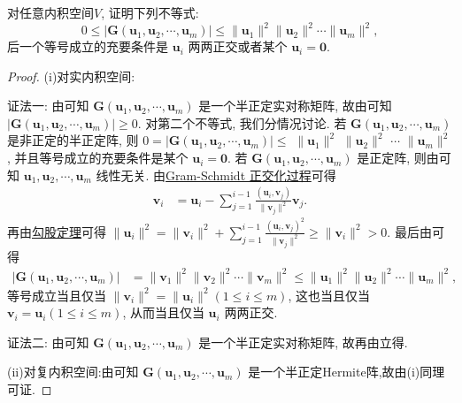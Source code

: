 \documentclass[../../main.tex]{subfiles}%
\begin{document}
\begin{proposition}\label{proposition:例9.16}
对任意内积空间$V$,
证明下列不等式:
\[
0 \leqslant  |\boldsymbol{G}(\boldsymbol{u}_1,\boldsymbol{u}_2,\cdots,\boldsymbol{u}_m)| \leqslant  \|\boldsymbol{u}_1\|^2\|\boldsymbol{u}_2\|^2\cdots\|\boldsymbol{u}_m\|^2,
\]
后一个等号成立的充要条件是 $\boldsymbol{u}_i$ 两两正交或者某个 $\boldsymbol{u}_i = \boldsymbol{0}$.
\end{proposition}
\begin{proof}

(i)对实内积空间:

{\color{blue}证法一:}
由可知 $\boldsymbol{G}(\boldsymbol{u}_1,\boldsymbol{u}_2,\cdots,\boldsymbol{u}_m)$ 是一个半正定实对称矩阵, 故由可知 $|\boldsymbol{G}(\boldsymbol{u}_1,\boldsymbol{u}_2,\cdots,\boldsymbol{u}_m)| \geqslant  0$. 对第二个不等式, 我们分情况讨论. 若 $\boldsymbol{G}(\boldsymbol{u}_1,\boldsymbol{u}_2,\cdots,\boldsymbol{u}_m)$ 是非正定的半正定阵, 则 $0 = |\boldsymbol{G}(\boldsymbol{u}_1,\boldsymbol{u}_2,\cdots,\boldsymbol{u}_m)| \leqslant $   $\|\boldsymbol{u}_1\|^2$  $\|\boldsymbol{u}_2\|^2$ $\cdots$ $\|\boldsymbol{u}_m\|^2$, 并且等号成立的充要条件是某个 $\boldsymbol{u}_i = \boldsymbol{0}$. 若 $\boldsymbol{G}(\boldsymbol{u}_1,\boldsymbol{u}_2,\cdots,\boldsymbol{u}_m)$ 是正定阵, 则由可知 $\boldsymbol{u}_1,\boldsymbol{u}_2,\cdots,\boldsymbol{u}_m$ 线性无关. 由\hyperref[theorem:Gram-Schmidt正交化方法]{Gram-Schmidt 正交化过程}可得
\begin{align*}
\boldsymbol{v}_i &= \boldsymbol{u}_i - \sum_{j = 1}^{i - 1} \frac{(\boldsymbol{u}_i,\boldsymbol{v}_j)}{\|\boldsymbol{v}_j\|^2} \boldsymbol{v}_j.
\end{align*}
再由\hyperref[corollary:范数性质的相关推广-勾股定理]{勾股定理}可得 $\|\boldsymbol{u}_i\|^2 = \|\boldsymbol{v}_i\|^2 + \sum_{j = 1}^{i - 1} \frac{(\boldsymbol{u}_i,\boldsymbol{v}_j)^2}{\|\boldsymbol{v}_j\|^2} \geqslant  \|\boldsymbol{v}_i\|^2 > 0$. 最后由可得
\begin{align*}
|\boldsymbol{G}(\boldsymbol{u}_1,\boldsymbol{u}_2,\cdots,\boldsymbol{u}_m)| &= \|\boldsymbol{v}_1\|^2\|\boldsymbol{v}_2\|^2\cdots\|\boldsymbol{v}_m\|^2 \leqslant  \|\boldsymbol{u}_1\|^2\|\boldsymbol{u}_2\|^2\cdots\|\boldsymbol{u}_m\|^2,
\end{align*}
等号成立当且仅当 $\|\boldsymbol{v}_i\|^2 = \|\boldsymbol{u}_i\|^2 (1 \leqslant  i \leqslant  m)$, 这也当且仅当 $\boldsymbol{v}_i = \boldsymbol{u}_i (1 \leqslant  i \leqslant  m)$, 从而当且仅当 $\boldsymbol{u}_i$ 两两正交.

{\color{blue}证法二:}
由可知 $\boldsymbol{G}(\boldsymbol{u}_1,\boldsymbol{u}_2,\cdots,\boldsymbol{u}_m)$ 是一个半正定实对称矩阵, 故再由立得.

(ii)对复内积空间:由可知 $\boldsymbol{G}(\boldsymbol{u}_1,\boldsymbol{u}_2,\cdots,\boldsymbol{u}_m)$ 是一个半正定Hermite阵,故由(i)同理可证.

\end{proof}
\end{document}
